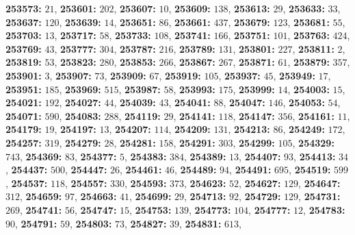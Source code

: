\textsf{\bfseries 253573:} $21$, \textsf{\bfseries 253601:} $202$, \textsf{\bfseries 253607:} $10$, \textsf{\bfseries 253609:} $138$, \textsf{\bfseries 253613:} $29$, \textsf{\bfseries 253633:} $33$, \textsf{\bfseries 253637:} $120$, \textsf{\bfseries 253639:} $14$, \textsf{\bfseries 253651:} $86$, \textsf{\bfseries 253661:} $437$, \textsf{\bfseries 253679:} $123$, \textsf{\bfseries 253681:} $55$, \textsf{\bfseries 253703:} $13$, \textsf{\bfseries 253717:} $58$, \textsf{\bfseries 253733:} $108$, \textsf{\bfseries 253741:} $166$, \textsf{\bfseries 253751:} $101$, \textsf{\bfseries 253763:} $424$, \textsf{\bfseries 253769:} $43$, \textsf{\bfseries 253777:} $304$, \textsf{\bfseries 253787:} $216$, \textsf{\bfseries 253789:} $131$, \textsf{\bfseries 253801:} $227$, \textsf{\bfseries 253811:} $2$, \textsf{\bfseries 253819:} $53$, \textsf{\bfseries 253823:} $280$, \textsf{\bfseries 253853:} $266$, \textsf{\bfseries 253867:} $267$, \textsf{\bfseries 253871:} $61$, \textsf{\bfseries 253879:} $357$, \textsf{\bfseries 253901:} $3$, \textsf{\bfseries 253907:} $73$, \textsf{\bfseries 253909:} $67$, \textsf{\bfseries 253919:} $105$, \textsf{\bfseries 253937:} $45$, \textsf{\bfseries 253949:} $17$, \textsf{\bfseries 253951:} $185$, \textsf{\bfseries 253969:} $515$, \textsf{\bfseries 253987:} $58$, \textsf{\bfseries 253993:} $175$, \textsf{\bfseries 253999:} $14$, \textsf{\bfseries 254003:} $15$, \textsf{\bfseries 254021:} $192$, \textsf{\bfseries 254027:} $44$, \textsf{\bfseries 254039:} $43$, \textsf{\bfseries 254041:} $88$, \textsf{\bfseries 254047:} $146$, \textsf{\bfseries 254053:} $54$, \textsf{\bfseries 254071:} $590$, \textsf{\bfseries 254083:} $288$, \textsf{\bfseries 254119:} $29$, \textsf{\bfseries 254141:} $118$, \textsf{\bfseries 254147:} $356$, \textsf{\bfseries 254161:} $11$, \textsf{\bfseries 254179:} $19$, \textsf{\bfseries 254197:} $13$, \textsf{\bfseries 254207:} $114$, \textsf{\bfseries 254209:} $131$, \textsf{\bfseries 254213:} $86$, \textsf{\bfseries 254249:} $172$, \textsf{\bfseries 254257:} $319$, \textsf{\bfseries 254279:} $28$, \textsf{\bfseries 254281:} $158$, \textsf{\bfseries 254291:} $303$, \textsf{\bfseries 254299:} $105$, \textsf{\bfseries 254329:} $743$, \textsf{\bfseries 254369:} $83$, \textsf{\bfseries 254377:} $5$, \textsf{\bfseries 254383:} $384$, \textsf{\bfseries 254389:} $13$, \textsf{\bfseries 254407:} $93$, \textsf{\bfseries 254413:} $34$, \textsf{\bfseries 254437:} $500$, \textsf{\bfseries 254447:} $26$, \textsf{\bfseries 254461:} $46$, \textsf{\bfseries 254489:} $94$, \textsf{\bfseries 254491:} $695$, \textsf{\bfseries 254519:} $599$, \textsf{\bfseries 254537:} $118$, \textsf{\bfseries 254557:} $330$, \textsf{\bfseries 254593:} $373$, \textsf{\bfseries 254623:} $52$, \textsf{\bfseries 254627:} $129$, \textsf{\bfseries 254647:} $312$, \textsf{\bfseries 254659:} $97$, \textsf{\bfseries 254663:} $41$, \textsf{\bfseries 254699:} $29$, \textsf{\bfseries 254713:} $92$, \textsf{\bfseries 254729:} $129$, \textsf{\bfseries 254731:} $269$, \textsf{\bfseries 254741:} $56$, \textsf{\bfseries 254747:} $15$, \textsf{\bfseries 254753:} $139$, \textsf{\bfseries 254773:} $104$, \textsf{\bfseries 254777:} $12$, \textsf{\bfseries 254783:} $90$, \textsf{\bfseries 254791:} $59$, \textsf{\bfseries 254803:} $73$, \textsf{\bfseries 254827:} $39$, \textsf{\bfseries 254831:} $613$, 
